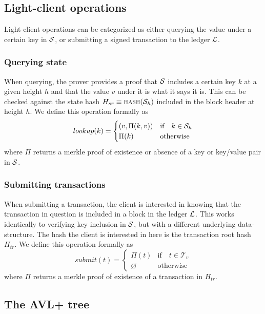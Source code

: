 \subsection{Light-client operations}

Light-client operations can be categorized as either querying the value under a
certain key in $\mathcal{S}$, or submitting a signed transaction to the ledger
$\mathcal{L}$.

\subsubsection{Querying state}

When querying, the prover provides a proof that $\mathcal{S}$ includes a certain key
$k$ at a given height $h$ and that the value $v$ under it is what it says it
is. This can be checked against the state hash $H_{sr} \equiv \text{\normalfont\scshape hash}(\mathcal{S}_h)$ included in the
block header at height $h$. We define this operation formally as
\[
    lookup(k) = \begin{cases}
        (v, \Pi(k, v))     & \text{if} \quad k \in \mathcal{S}_h \\
        \Pi(k)             & \text{otherwise}
    \end{cases}
\]
where $\Pi$ returns a merkle proof of existence or absence of a key or
key/value pair in $\mathcal{S}$.

\subsubsection{Submitting transactions}

When submitting a transaction, the client is interested in knowing that the
transaction in question is included in a block in the ledger $\mathcal{L}$. This
works identically to verifying key inclusion in $\mathcal{S}$, but with a different
underlying data-structure. The hash the client is interested in here is the
transaction root hash $H_{tr}$. We define this operation formally as
\[
    submit(t) = \begin{cases}
        \Pi(t)        & \text{if} \quad t \in \mathcal{T}_v \\
        \varnothing   & \text{otherwise}
    \end{cases}
\]
where $\Pi$ returns a merkle proof of existence of a transaction in $H_{tr}$.

\subsection{The AVL+ tree}


